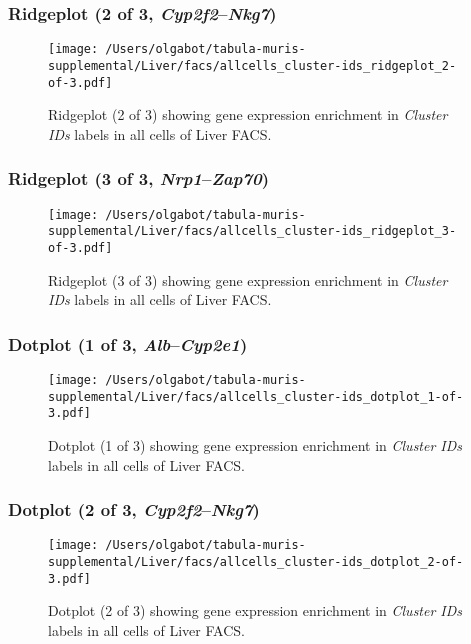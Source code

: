 \clearpage

\subsubsection{Ridgeplot (2 of 3, \emph{Cyp2f2}--\emph{Nkg7})}
\begin{figure}[h]
\centering
\texttt{[image: /Users/olgabot/tabula-muris-supplemental/Liver/facs/allcells\_cluster-ids\_ridgeplot\_2-of-3.pdf]}

\caption{ Ridgeplot (2 of 3)  showing gene expression enrichment in \emph{Cluster IDs} labels in all cells of Liver FACS. }
\end{figure}


\clearpage

\subsubsection{Ridgeplot (3 of 3, \emph{Nrp1}--\emph{Zap70})}
\begin{figure}[h]
\centering
\texttt{[image: /Users/olgabot/tabula-muris-supplemental/Liver/facs/allcells\_cluster-ids\_ridgeplot\_3-of-3.pdf]}

\caption{ Ridgeplot (3 of 3)  showing gene expression enrichment in \emph{Cluster IDs} labels in all cells of Liver FACS. }
\end{figure}


\clearpage

\subsubsection{Dotplot (1 of 3, \emph{Alb}--\emph{Cyp2e1})}
\begin{figure}[h]
\centering
\texttt{[image: /Users/olgabot/tabula-muris-supplemental/Liver/facs/allcells\_cluster-ids\_dotplot\_1-of-3.pdf]}

\caption{ Dotplot (1 of 3)  showing gene expression enrichment in \emph{Cluster IDs} labels in all cells of Liver FACS. }
\end{figure}


\clearpage

\subsubsection{Dotplot (2 of 3, \emph{Cyp2f2}--\emph{Nkg7})}
\begin{figure}[h]
\centering
\texttt{[image: /Users/olgabot/tabula-muris-supplemental/Liver/facs/allcells\_cluster-ids\_dotplot\_2-of-3.pdf]}

\caption{ Dotplot (2 of 3)  showing gene expression enrichment in \emph{Cluster IDs} labels in all cells of Liver FACS. }
\end{figure}


